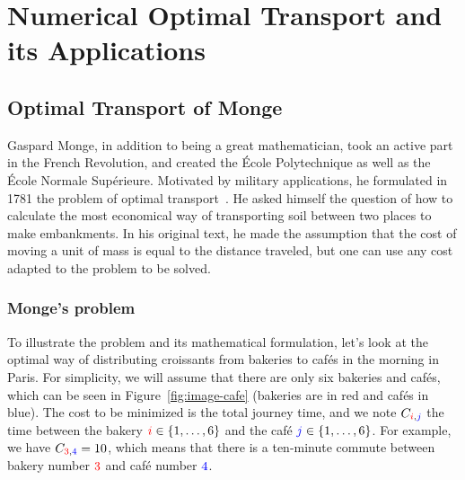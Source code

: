 
\newcommand{\Blu}[1]{{\color{blue}#1}}
\newcommand{\Red}[1]{{\color{red}#1}}
\newcommand{\iC}{\Red{i}}
\newcommand{\jC}{\Blu{j}}
\newcommand{\aC}{\Red{a}}
\newcommand{\bC}{\Blu{b}}


\ifdefined\otarticle
\newcommand{\myparagraph}[1]{\subsection{#1}}
\else
\newcommand{\myparagraph}[1]{\paragraph{#1}}
\chapter{Numerical Optimal Transport and its Applications}
\fi

\label{chap-ot}


\section{Optimal Transport of Monge}

Gaspard Monge, in addition to being a great mathematician, took an active part in the French Revolution, and created the \'Ecole Polytechnique as well as the \'Ecole Normale Sup\'erieure. Motivated by military applications, he formulated in 1781 the problem of optimal transport~\cite{Monge1781}. He asked himself the question of how to calculate the most economical way of transporting soil between two places to make embankments. In his original text, he made the assumption that the cost of moving a unit of mass is equal to the distance traveled, but one can use any cost adapted to the problem to be solved.

\myparagraph{Monge's problem}

To illustrate the problem and its mathematical formulation, let's look at the optimal way of distributing croissants from bakeries to caf\'es in the morning in Paris. For simplicity, we will assume that there are only six bakeries and caf\'es, which can be seen in Figure~\ref{fig:image-cafe} (bakeries are in \Red{red} and caf\'es in \Blu{blue}). The cost to be minimized is the total journey time, and we note $C_{\iC, \jC}$  the time between the bakery $\iC \in \{1, \ldots, 6\}$ and the caf\'e $\jC \in \{1, \ldots, 6\}$. For example, we have $C_{\Red{3}, \Blu{4}} = 10$, which means that there is a ten-minute commute between bakery number $\Red{3}$ and caf\'e number $\Blu{4}$.


